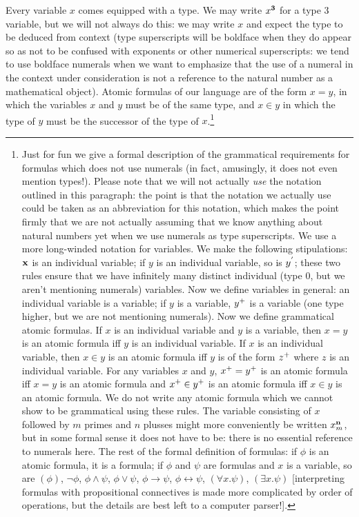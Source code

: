 \documentclass[12pt]{book}
\begin{document}
Every variable $x$ comes equipped with a type.  We may write $x^{\bf
3}$ for a type 3 variable, but we will not always do this:  we may write $x$ and expect the type to be deduced from context (type superscripts will be boldface when
they do appear so as not to be confused with exponents or other
numerical superscripts:  we tend to use boldface numerals when we want to emphasize that the use of a numeral in the context under consideration is not a reference to the natural number as a mathematical object).  Atomic
formulas of our language are of the form $x=y$, in which the variables
$x$ and $y$ must be of the same type, and $x \in y$ in which the type
of $y$ must be the successor of the type of $x$.\footnote{Just for fun we give a formal description of the grammatical
requirements for formulas which does not use numerals (in fact,
amusingly, it does not even mention types!).  Please note that we will
not actually {\em use\/} the notation outlined in this paragraph: the
point is that the notation we actually use could be taken as an
abbreviation for this notation, which makes the point firmly that we
are not actually assuming that we know anything about natural numbers
yet when we use numerals as type superscripts.  We use a more
long-winded notation for variables.  We make the following
stipulations: ${\bf x}$ is an individual variable; if $y$ is an
individual variable, so is $y^{\bf '}$; these two rules ensure that we
have infinitely many distinct individual (type 0, but we aren't
mentioning numerals) variables.  Now we define variables in general:
an individual variable is a variable; if $y$ is a variable, $y^{\bf
+}$ is a variable (one type higher, but we are not mentioning
numerals).  Now we define grammatical atomic formulas.  If $x$ is an
individual variable and $y$ is a variable, then $x=y$ is an atomic
formula iff $y$ is an individual variable.  If $x$ is an individual
variable, then $x \in y$ is an atomic formula iff $y$ is of the form
$z^{\bf +}$ where $z$ is an individual variable.  For any variables
$x$ and $y$, $x^{\bf +}=y^{\bf +}$ is an atomic formula iff $x=y$ is
an atomic formula and $x^{\bf +}\in y^{\bf +}$ is an atomic formula
iff $x\in y$ is an atomic formula.  We do not write any atomic formula
which we cannot show to be grammatical using these rules.  The
variable consisting of $x$ followed by $m$ primes and $n$ plusses
might more conveniently be written $x_m^{\bf n}$, but in some formal
sense it does not have to be: there is no essential reference to
numerals here.  The rest of the formal definition of formulas: if
$\phi$ is an atomic formula, it is a formula; if $\phi$ and $\psi$ are
formulas and $x$ is a variable, so are $(\phi)$, $\neg\phi$, $\phi
\wedge\psi$, $\phi \vee\psi$, $\phi\rightarrow \psi$, $\phi \leftrightarrow
\psi$, $(\forall x.\psi)$, $(\exists x.\psi)$ [interpreting formulas
with propositional connectives is made more complicated by order of
operations, but the details are best left to a computer parser!].}
\end{document}
